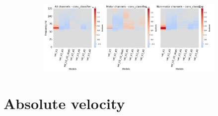 \begin{figure}[!htpb]
\begin{subfigure}[b]{\textwidth}
   \includegraphics[width=1\linewidth]{img/appendix/A/conv-classifier/hp-sm/vel-model_gradients_all_kinds}
   \caption{}
   \label{fig:vel-hp-shifted-grads-conv-classifier}
\end{subfigure}

\caption[]{}
\label{fig:vel-hp-shifted-grads}
\end{figure}

\section*{Absolute velocity}\label{sec:absolute-velocity-appendixB}

